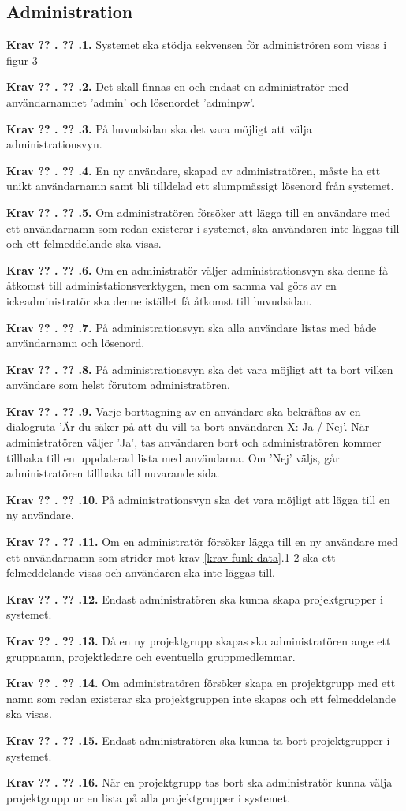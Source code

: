 \documentclass[a4paper]{article}
\newcommand\getcurrentref[1]{%
 \ifnumequal{\value{#1}}{0}
  {??}
  {\the\value{#1}}%
}
\newcommand\requirement[2]{
	\numberedrow{Krav}{#1}{#2}
}
\newcommand\numberedrow[3]{
	\noindent
	\textbf{#1 \getcurrentref{section}.\getcurrentref{subsection}.#2.} #3
	
}
\begin{document}
\subsection{Administration}
\requirement{1}{Systemet ska stödja sekvensen för administrören som visas i figur 3}
\requirement{2}{Det skall finnas en och endast en administratör med användarnamnet 'admin' och lösenordet 'adminpw'.}
\requirement{3}{På huvudsidan ska det vara möjligt att välja administrationsvyn.}
\requirement{4}{En ny användare, skapad av administratören, måste ha ett unikt användarnamn samt bli tilldelad ett slumpmässigt lösenord från systemet.}
\requirement{5}{Om administratören försöker att lägga till en användare med ett användarnamn som redan existerar i systemet, ska användaren inte läggas till och ett felmeddelande ska visas.}
\requirement{6}{Om en administratör väljer administrationsvyn ska denne få åtkomst till administationsverktygen, men om samma val görs av en ickeadministratör ska denne istället få åtkomst till huvudsidan.}
\requirement{7}{På administrationsvyn ska alla användare listas med både användarnamn och lösenord.}
\requirement{8}{På administrationsvyn ska det vara möjligt att ta bort vilken användare som helst förutom administratören.}
\requirement{9}{Varje borttagning av en användare ska bekräftas av en dialogruta 'Är du säker på att du vill ta bort användaren X: Ja / Nej'. När administratören väljer 'Ja', tas användaren bort och administratören kommer tillbaka till en uppdaterad lista med användarna. Om 'Nej' väljs, går administratören tillbaka till nuvarande sida.}
\requirement{10}{På administrationsvyn ska det vara möjligt att lägga till en ny användare.}
\requirement{11}{Om en administratör försöker lägga till en ny användare med ett användarnamn som strider mot krav \ref{krav-funk-data}.1-2 ska ett felmeddelande visas och användaren ska inte läggas till.}

\requirement{12}{Endast administratören ska kunna skapa projektgrupper i systemet.}

\requirement{13}{Då en ny projektgrupp skapas ska administratören ange ett gruppnamn, projektledare och eventuella gruppmedlemmar.}

\requirement{14}{Om administratören försöker skapa en projektgrupp med ett namn som redan existerar ska projektgruppen inte skapas och ett felmeddelande ska visas.}
\requirement{15}{Endast administratören ska kunna ta bort projektgrupper i systemet.}
\requirement{16}{När en projektgrupp tas bort ska administratör kunna välja projektgrupp ur en lista på alla projektgrupper i systemet.}
\end{document}
